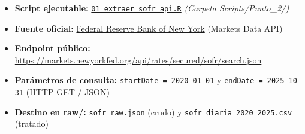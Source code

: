 \documentclass[
  10pt,
  letterpaper,
  DIV=11,
  numbers=noendperiod]{scrartcl}
\providecommand{\tightlist}{%
  \setlength{\itemsep}{0pt}\setlength{\parskip}{0pt}}
\begin{document}
\begin{itemize}
\tightlist
\item
  \textbf{Script ejecutable:}
  \href{https://github.com/MPalma21/Talleres_de_R/blob/main/Entregable_Talleres/Taller_3/Scripts/Punto_2/01_extraer_sofr_api.R}{\texttt{01\_extraer\_sofr\_api.R}}
  \emph{(Carpeta Scripts/Punto\_2/)}
\item
  \textbf{Fuente oficial:}
  \href{https://www.newyorkfed.org/markets/reference-rates/sofr}{Federal
  Reserve Bank of New York} (Markets Data API)
\item
  \textbf{Endpoint público:}
  \url{https://markets.newyorkfed.org/api/rates/secured/sofr/search.json}
\item
  \textbf{Parámetros de consulta:} \texttt{startDate\ =\ 2020-01-01} y
  \texttt{endDate\ =\ 2025-10-31} (HTTP GET / JSON)
\item
  \textbf{Destino en raw/:} \texttt{sofr\_raw.json} (crudo) y
  \texttt{sofr\_diaria\_2020\_2025.csv} (tratado)
\end{itemize}
\end{document}
